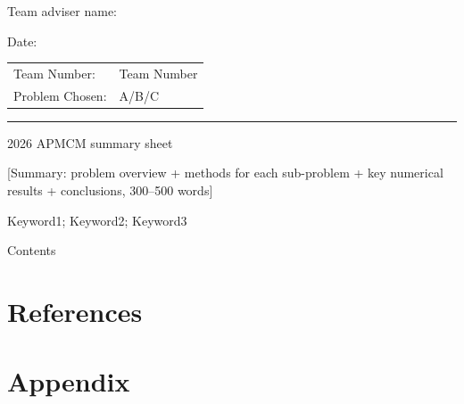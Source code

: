 \documentclass[fontset=windows, 12pt, a4paper]{ctexart}
\begin{document}
\noindent Team adviser name: \underline{}

\vspace{1.05em}
\hfill Date: \underline{\makebox[4cm]{}}

\newpage

\vspace{0.4em}
\begin{center}
\begin{tabular}{ll}
  Team Number: & Team Number \\
  Problem Chosen: & A/B/C \\
\end{tabular}
\end{center}
\vspace{1.35em}
\noindent\rule{\textwidth}{2pt}
\vspace{1.35em}

\begin{center}
  {\fontsize{12pt}{14.4pt} 2026 APMCM summary sheet}
\end{center}
\vspace{1.2em}

[Summary: problem overview + methods for each sub-problem + key numerical results + conclusions, 300--500 words]

\vspace{0.45em}

 Keyword1; Keyword2; Keyword3

\newpage

\begin{center}
  {\fontsize{17pt}{20.4pt} Contents}
\end{center}
\vspace{1em}
\tableofcontents
\newpage









\section*{References}


\section*{Appendix}

\end{document}
